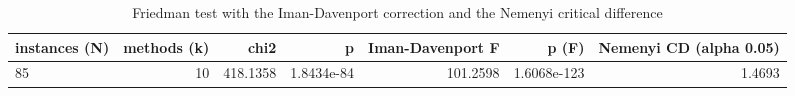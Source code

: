 \begin{table}[htbp]
\centering
\small
\caption{Friedman test with the Iman-Davenport correction and the Nemenyi critical difference}
\label{tab:E2b_head_to_head_budgets_b1_friedman_test}
\begin{tabular}{lrrrrrr}
\toprule
instances (N) & methods (k) & chi2 & p & Iman-Davenport F & p (F) & Nemenyi CD (alpha 0.05) \\
\midrule
85 & 10 & 418.1358 & 1.8434e-84 & 101.2598 & 1.6068e-123 & 1.4693 \\
\bottomrule
\end{tabular}
\end{table}

